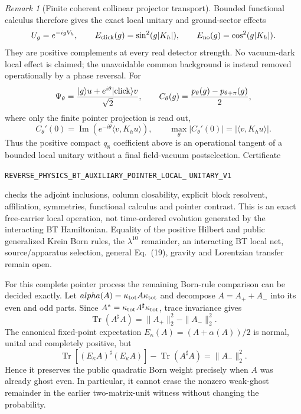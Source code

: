 \documentclass[11pt]{article}
\theoremstyle{definition}
\theoremstyle{remark}
\newtheorem{remark}[theorem]{Remark}
\begin{document}
\begin{remark}[Finite coherent collinear projector transport]
Bounded functional calculus therefore gives the exact local unitary and
ground-sector effects
\[
 U_g=e^{-igV_h},\qquad
 E_{\rm click}(g)=\sin^2(g|K_h|),\qquad
 E_{\rm no}(g)=\cos^2(g|K_h|).
\]
They are positive complements at every real detector strength.  No
vacuum-dark local effect is claimed; the unavoidable common background is
instead removed operationally by a phase reversal.  For
\[
 \Psi_\theta={|g\rangle u+e^{i\theta}|{\rm click}\rangle v\over\sqrt2},
 \qquad
 C_\theta(g)={p_\theta(g)-p_{\theta+\pi}(g)\over2},
\]
where only the finite pointer projection is read out,
\[
 C_\theta'(0)=
 \operatorname{Im}\!\left(e^{-i\theta}\langle v,K_hu\rangle\right),
 \qquad
 \max_\theta|C_\theta'(0)|=|\langle v,K_hu\rangle|.
\]
Thus the positive compact $q_8$ coefficient above is an operational tangent
of a bounded local unitary without a final field-vacuum postselection.
Certificate
\par\noindent
\texttt{REVERSE\_PHYSICS\_BT\_AUXILIARY\_POINTER\_LOCAL\_}
\allowbreak\texttt{UNITARY\_V1}
\par\noindent
checks the adjoint inclusions, column closability, explicit block resolvent,
affiliation, symmetries, functional calculus and pointer contrast.  This is
an exact free-carrier local operation, not time-ordered evolution generated
by the interacting BT Hamiltonian.  Equality of the positive Hilbert and
public generalized Krein Born rules, the $\lambda^{10}$ remainder, an
interacting BT local net, source/apparatus selection, general Eq.~(19),
gravity and Lorentzian transfer remain open.

For this complete pointer process the remaining Born-rule comparison can be
decided exactly.  Let
\(alpha(A)=\kappa_{\rm tot}A\kappa_{\rm tot}\) and decompose
\(A=A_++A_-\) into its even and odd parts.  Since
\(A^*=\kappa_{\rm tot}A^\sharp\kappa_{\rm tot}\), trace invariance gives
\[
 \operatorname{Tr}(A^\sharp A)
 =\|A_+\|_2^2-\|A_-\|_2^2.
\]
The canonical fixed-point expectation
\(E_\kappa(A)=(A+\alpha(A))/2\) is normal, unital and completely positive,
but
\[
 \operatorname{Tr}[(E_\kappa A)^\sharp(E_\kappa A)]
 -\operatorname{Tr}(A^\sharp A)=\|A_-\|_2^2.
\]
Hence it preserves the public quadratic Born weight precisely when $A$ was
already ghost even.  In particular, it cannot erase the nonzero weak-ghost
remainder in the earlier two-matrix-unit witness without changing the
probability.


\end{remark}
\end{document}
